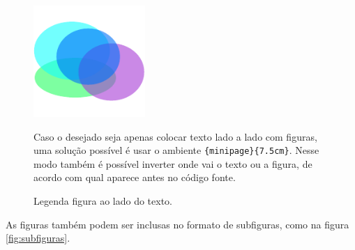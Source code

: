     \begin{figure}[htb]
        \centering
        \begin{minipage}{7.5cm}
            \centering
            \includegraphics[width=120pt]{images/figure.pdf}
            \caption{Legenda figura ao lado do texto.}
            \label{fig:texto_do_lado}
        \end{minipage}
        \hfill
        \begin{minipage}{7.5cm}
            \linespread{1.5}\selectfont
            
            Caso o desejado seja apenas colocar texto lado a lado com figuras, uma solução possível é usar o ambiente \lstinline[language=TeX,style=code]|{minipage}{7.5cm}|.
            Nesse modo também é possível inverter onde vai o texto ou a figura, de acordo com qual aparece antes no código fonte.

        \end{minipage}
    \end{figure}

    As figuras também podem ser inclusas no formato de subfiguras, como na figura \ref{fig:subfiguras}.

